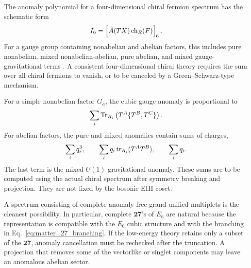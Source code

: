 \documentclass[aps,prd,preprint,longbibliography,nofootinbib,superscriptaddress,floatfix]{revtex4-2}
\begin{document}
The anomaly polynomial for a four-dimensional chiral fermion spectrum has the
schematic form
\begin{equation}
    I_6
    =
    \left[
        \hat A(TX)\,
        {\rm ch}_R(F)
    \right]_6 .
    \label{eq:matter_anomaly_polynomial}
\end{equation}
For a gauge group containing nonabelian and abelian factors, this includes pure
nonabelian, mixed nonabelian-abelian, pure abelian, and mixed
gauge-gravitational terms \cite{BardeenAnomalies,AlvarezGaumeWitten}. A
consistent four-dimensional chiral theory requires the sum over all chiral
fermions to vanish, or to be canceled by a Green--Schwarz-type mechanism.

For a simple nonabelian factor \(G_a\), the cubic gauge anomaly is proportional
to
\begin{equation}
    \sum_i {\rm Tr}_{R_i}
    \left(
        T^A\{T^B,T^C\}
    \right).
    \label{eq:matter_nonabelian_anomaly}
\end{equation}
For abelian factors, the pure and mixed anomalies contain sums of charges,
\begin{equation}
    \sum_i q_i^3,
    \qquad
    \sum_i q_i\,{\rm tr}_{R_i}(T^AT^B),
    \qquad
    \sum_i q_i .
    \label{eq:matter_abelian_anomalies}
\end{equation}
The last term is the mixed \(U(1)\)-gravitational anomaly. These sums are to be
computed using the actual chiral spectrum after symmetry breaking and
projection. They are not fixed by the bosonic EIII coset.

A spectrum consisting of complete anomaly-free grand-unified multiplets is the
cleanest possibility. In particular, complete \(\mathbf{27}\)'s of \(E_6\) are
natural because the representation is compatible with the \(E_6\) cubic
structure and with the branching in Eq.~\eqref{eq:matter_27_branching}. If the
low-energy theory retains only a subset of the \(\mathbf{27}\), anomaly
cancellation must be rechecked after the truncation. A projection that removes
some of the vectorlike or singlet components may leave an anomalous abelian
sector.
\end{document}
